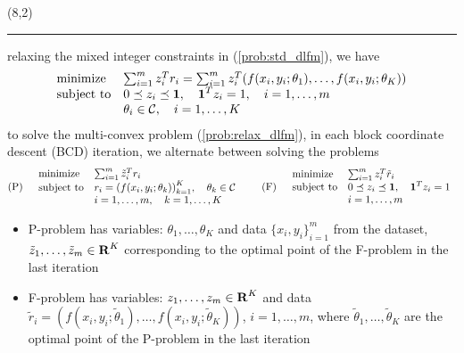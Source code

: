 \documentclass[a0]{a0poster}
\begin{document}
\begin{textblock}{7}(8,2)
    \hrule\vspace*{0.5\baselineskip}

    relaxing the mixed integer constraints in (\ref{prob:std_dlfm}), we have
    \begin{equation}\label{prob:relax_dlfm}
        \begin{array}{ll}
            \mbox{minimize} & \sum_{i = 1}^{m} z_i^T r_i = \sum_{i = 1}^{m} z_i^T (f(x_i, y_i; \theta_1), \ldots, f(x_i, y_i; \theta_K))\\
            \mbox{subject to} & 0 \preceq z_i \preceq {\bf 1{}},\quad {\bf 1{}}^T z_i = 1,\quad i = 1, \ldots, m\\
            & \theta_i \in {\cal C{}},\quad i = 1, \ldots, K
        \end{array}
    \end{equation}
    to solve the multi-convex problem (\ref{prob:relax_dlfm}), in each block coordinate descent (BCD) iteration, we alternate between solving the problems
    \[
        \mbox{(P)}\quad
        \begin{array}{ll}
            \mbox{minimize} & \sum_{i = 1}^{m} \tilde{z}_i^T r_i\\
            \mbox{subject to} & r_i = {(f(x_i, y_i; \theta_k))}_{k = 1}^K,\quad \theta_k \in {\cal C{}}\\
            & i = 1, \ldots, m,\quad k = 1, \ldots, K\\
        \end{array}\qquad
        \mbox{(F)}\quad
        \begin{array}{ll}
            \mbox{minimize} & \sum_{i = 1}^{m} z_i^T \tilde{r}_i\\
            \mbox{subject to} & 0 \preceq z_i \preceq {\bf 1{}},\quad {\bf 1{}}^T z_i = 1\\
            & i = 1, \ldots, m
        \end{array}
    \]
    \begin{itemize}
        \item P-problem has variables: $\theta_1, \ldots, \theta_K$ and data ${\{x_i, y_i\}}_{i = 1}^m$ from the dataset, $\tilde{z}_1, \ldots, \tilde{z}_m \in {\bf R{}}^K$ corresponding to the optimal point of the F-problem in the last iteration
        \item F-problem has variables: $z_1, \ldots, z_m \in {\bf R{}}^K$ and data $\tilde{r}_i = (f(x_i, y_i; \tilde{\theta}_1), \ldots, f(x_i, y_i; \tilde{\theta}_K))$, $i = 1, \ldots, m$, where $\tilde{\theta}_1, \ldots, \tilde{\theta}_K$ are the optimal point of the P-problem in the last iteration
    \end{itemize}


\end{textblock}
\end{document}
